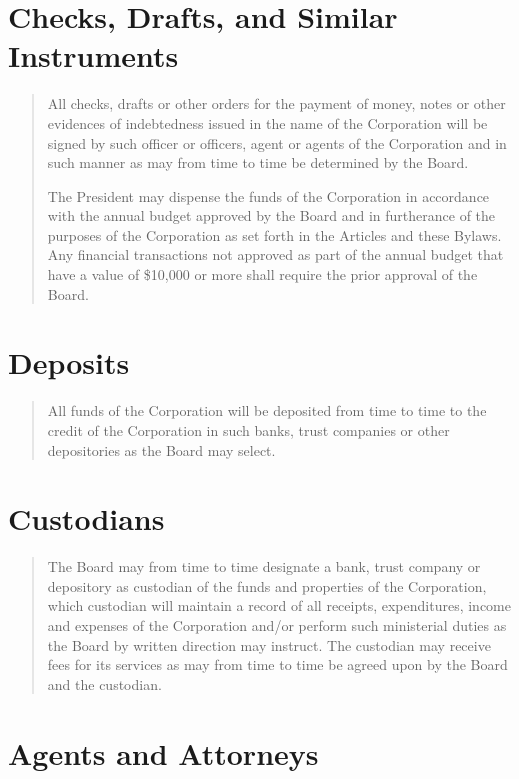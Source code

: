 \documentclass[
]{book}
\begin{document}
\section{Checks, Drafts, and Similar Instruments}\label{checks-drafts-and-similar-instruments}

\begin{quote}
All checks, drafts or other orders for the payment of money, notes or
other evidences of indebtedness issued in the name of the Corporation
will be signed by such officer or officers, agent or agents of the
Corporation and in such manner as may from time to time be determined
by the Board.

The President may dispense the funds of the Corporation in accordance
with the annual budget approved by the Board and in furtherance of the
purposes of the Corporation as set forth in the Articles and these
Bylaws. Any financial transactions not approved as part of the annual
budget that have a value of \$10,000 or more shall require the prior
approval of the Board.
\end{quote}

\section{Deposits}\label{deposits}

\begin{quote}
All funds of the Corporation will be deposited from time to time to
the credit of the Corporation in such banks, trust companies or other
depositories as the Board may select.
\end{quote}

\section{Custodians}\label{custodians}

\begin{quote}
The Board may from time to time designate a bank, trust company or
depository as custodian of the funds and properties of the
Corporation, which custodian will maintain a record of all receipts,
expenditures, income and expenses of the Corporation and/or perform
such ministerial duties as the Board by written direction may
instruct. The custodian may receive fees for its services as may from
time to time be agreed upon by the Board and the custodian.
\end{quote}

\section{Agents and Attorneys}\label{agents-and-attorneys}
\end{document}
